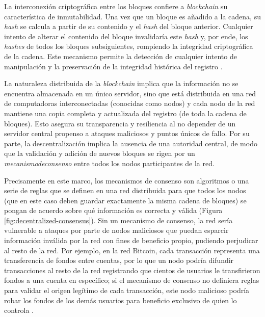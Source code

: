 La interconexión criptográfica entre los bloques confiere a \textit{blockchain} su característica de inmutabilidad. Una vez que un bloque es añadido a la cadena, su \textit{hash} se calcula a partir de su contenido y el \textit{hash} del bloque anterior. Cualquier intento de alterar el contenido del bloque invalidaría este \textit{hash} y, por ende, los \textit{hashes} de todos los bloques subsiguientes, rompiendo la integridad criptográfica de la cadena. Este mecanismo permite la detección de cualquier intento de manipulación y la preservación de la integridad histórica del registro \cite{bulkowska2023implementation}. 

La naturaleza distribuida de la \textit{blockchain} implica que la información no se encuentra almacenada en un único servidor, sino que está distribuida en una red de computadoras interconectadas (conocidas como nodos) y cada \gls{nodo} de la red mantiene una copia completa y actualizada del registro (de toda la cadena de bloques). Esto asegura su transparencia y resiliencia al no depender de un servidor central \cite{bulkowska2023implementation} propenso a ataques maliciosos y puntos únicos de fallo. Por su parte, la descentralización implica la ausencia de una autoridad central, de modo que la validación y adición de nuevos bloques se rigen por un \textit{\gls{mecanismodeconsenso}} entre todos los nodos participantes de la red. 

Precisamente en este marco, los mecanismos de consenso son algoritmos o una serie de reglas que se definen en una red distribuida para que todos los nodos (que en este caso deben guardar exactamente la misma cadena de bloques) se pongan de acuerdo sobre qué información es correcta y válida (Figura \ref{fig:decentralized-consensus}). Sin un mecanismo de consenso, la red sería vulnerable a ataques por parte de nodos maliciosos que puedan esparcir información inválida por la red con fines de beneficio propio, pudiendo perjudicar al resto de la red. Por ejemplo, en la red Bitcoin, cada transacción representa una transferencia de fondos entre cuentas, por lo que un nodo podría difundir transacciones al resto de la red registrando que cientos de usuarios le transfirieron fondos a una cuenta en específico; si el mecanismo de consenso no definiera reglas para validar el origen legítimo de cada transacción, este nodo malicioso podría robar los fondos de los demás usuarios para beneficio exclusivo de quien lo controla \cite{satoshi2008bitcoin}.

